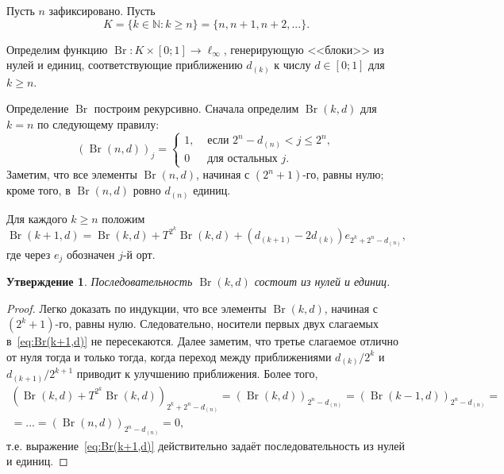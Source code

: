 \documentclass[a4paper,14pt]{article} %
\theoremstyle{plain}
\newtheorem{proposition}[lemma]{Утверждение}
\begin{document}
Пусть $n$ зафиксировано.
Пусть
\begin{equation}
	K = \{k\in\mathbb{N} : k \geq n\} = \{n, n+1, n+2, ...\}
	.
\end{equation}


Определим функцию $\operatorname{Br}:K\times [0;1] \to \ell_\infty$,
генерирующую <<блоки>> из нулей и единиц,
соответствующие приближению $d_{(k)}$ к числу $d\in[0;1]$ для $k \geq n$.

Определение $\operatorname{Br}$ построим рекурсивно.
Сначала определим $\operatorname{Br}(k,d)$ для $k=n$ по следующему правилу:
\begin{equation}
	(\operatorname{Br}(n,d))_j = \begin{cases}
		1, & \mbox{~если~} 2^n - d_{(n)} < j \leq 2^n,
		\\
		0  & \mbox{~для остальных~} j
		.
	\end{cases}
\end{equation}
Заметим, что все элементы $\operatorname{Br}(n,d)$, начиная с $(2^n+1)$-го, равны нулю;
кроме того, в $\operatorname{Br}(n,d)$ ровно $d_{(n)}$ единиц.

Для каждого $k \geq n$ положим
\begin{equation}
	\label{eq:Br(k+1,d)}
	\operatorname{Br}(k+1,d) = \operatorname{Br}(k,d) + T^{2^k}\operatorname{Br}(k,d) + (d_{(k+1)}-2d_{(k)})e_{2^k+2^n-d_{(n)}}
	,
\end{equation}
где через $e_j$ обозначен $j$-й орт.


\begin{proposition}
	\label{prop:Br_k_c_0_1}
	Последовательность $\operatorname{Br}(k,d)$ состоит из нулей и единиц.
\end{proposition}
\begin{proof}
	Легко доказать по индукции, что все элементы $\operatorname{Br}(k,d)$, начиная с $(2^k+1)$-го, равны нулю.
	Следовательно, носители первых двух слагаемых в~\eqref{eq:Br(k+1,d)} не пересекаются.
	Далее заметим, что третье слагаемое отлично от нуля тогда и только тогда,
	когда переход между приближениями $d_{(k)} / 2^k$ и $d_{(k+1)}/2^{k+1}$
	приводит к улучшению приближения.
	Более того,
	\begin{multline}
		\left(\operatorname{Br}(k,d) + T^{2^k}\operatorname{Br}(k,d)\right)_{2^k+2^n-d_{(n)}}
		=
		(\operatorname{Br}(k,d))_{2^n-d_{(n)}}
		=
		(\operatorname{Br}(k-1,d))_{2^n-d_{(n)}}
		=
		\\=
		...
		=
		(\operatorname{Br}(n,d))_{2^n-d_{(n)}}
		=
		0
		,
	\end{multline}
	т.е. выражение~\eqref{eq:Br(k+1,d)} действительно задаёт последовательность из нулей и единиц.
\end{proof}
\end{document}
